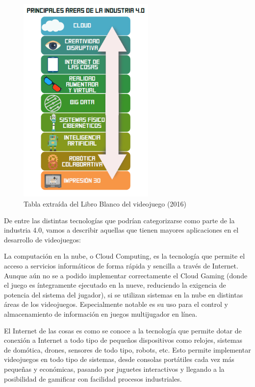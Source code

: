 \begin{figure}[h]
    \centering
    \includegraphics[width=0.6\textwidth]{images/estadodelarte/mercado/tabla-web-4}
    \caption{Tabla extraída del Libro Blanco del videojuego (2016)}
\end{figure}

De entre las distintas tecnologías que podrían categorizarse como parte de la industria 4.0, vamos a describir aquellas que tienen mayores aplicaciones en el desarrollo de videojuegos:

La computación en la nube, o Cloud Computing, es la tecnología que permite el acceso a servicios informáticos de forma rápida y sencilla a través de Internet. Aunque aún no se a podido implementar correctamente el Cloud Gaming (donde el juego es íntegramente ejecutado en la nueve, reduciendo la exigencia de potencia del sistema del jugador), si se utilizan sistemas en la nube en distintas áreas de los videojuegos. Especialmente notable es su uso para el control y almacenamiento de información en juegos multijugador en línea.

El Internet de las cosas es como se conoce a la tecnología que permite dotar de conexión a Internet a todo tipo de pequeños dispositivos como relojes, sistemas de domótica, drones, sensores de todo tipo, robots, etc. Esto permite implementar videojuegos en todo tipo de sistemas, desde consolas portátiles cada vez más pequeñas y económicas, pasando por juguetes interactivos y llegando a la posibilidad de gamificar con facilidad procesos industriales.

